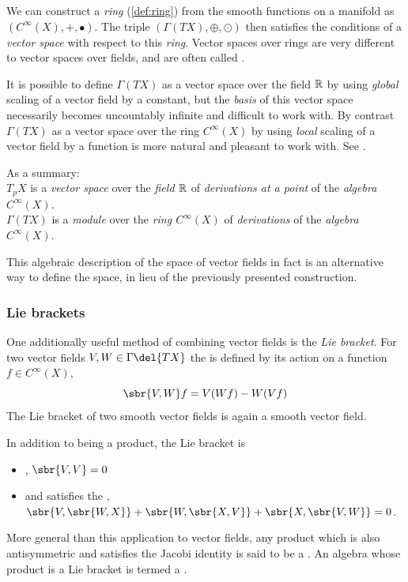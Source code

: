 We can construct a \emph{ring} (\cref{def:ring}) from the smooth functions on a manifold as \((C^\infty(X), +, \bullet)\).
The triple \((\Gamma(TX), \oplus, \odot)\label{def:tangent_bundle_module}\) then satisfies the conditions of a \emph{vector space} with respect to this \emph{ring}.
Vector spaces over rings are very different to vector spaces over fields, and are often called .

It is possible to define \(\Gamma(TX)\) as a vector space over the field \(\mathbb{R}\) by using \emph{global} scaling of a vector field by a constant, but the \emph{basis} of this vector space necessarily becomes uncountably infinite and difficult to work with.
By contrast \(\Gamma(TX)\) as a vector space over the ring \(C^\infty(X)\) by using \emph{local} scaling of a vector field by a function is more natural and pleasant to work with.
See \cite{schuller2013lectures}.

As a summary:\\
\(T_pX\) is a \emph{vector space} over the \emph{field \(\mathbb{R}\)} of \emph{derivations at a point} of the \emph{algebra} \(C^\infty(X)\).\\
\(\Gamma(TX)\) is a \emph{module} over the \emph{ring \(C^\infty(X)\)} of \emph{derivations} of the \emph{algebra} \(C^\infty(X)\).

This algebraic description of the space of vector fields in fact is an alternative way to define the space, in lieu of the previously presented construction.

\subsubsection{Lie brackets}
One additionally useful method of combining vector fields is the \emph{Lie bracket}.
For two vector fields \(V, W \in \Gamma\del{TX}\) the  is defined by its action on a function \(f\in C^\infty(X)\), 
\[
	\sbr{V, W} f = V(Wf) - W(Vf)
\]
The Lie bracket of two smooth vector fields is again a smooth vector field.

In addition to being a product, the Lie bracket is 
\begin{itemize}
	\item {}, \(\sbr{V, V} = 0\)
	\item and satisfies the , \(\sbr{V, \sbr{W,X}} + \sbr{W, \sbr{X,V}} + \sbr{X, \sbr{V,W}} = 0\).
\end{itemize}
More general than this application to vector fields, any product which is also antisymmetric and satisfies the Jacobi identity is said to be a .
An algebra whose product is a Lie bracket is termed a .

